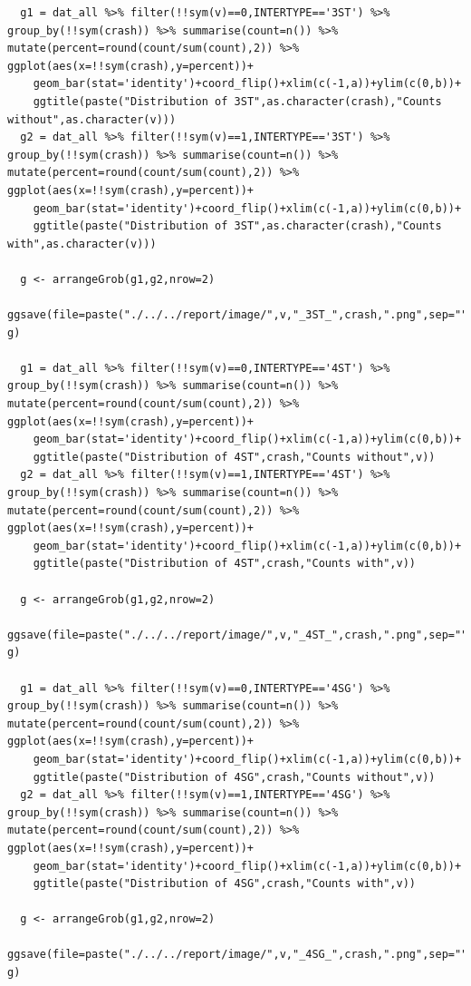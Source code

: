 \documentclass[11pt]{scrartcl} %
\begin{document}
\begin{lstlisting}
  g1 = dat_all %>% filter(!!sym(v)==0,INTERTYPE=='3ST') %>% group_by(!!sym(crash)) %>% summarise(count=n()) %>% mutate(percent=round(count/sum(count),2)) %>% ggplot(aes(x=!!sym(crash),y=percent))+
    geom_bar(stat='identity')+coord_flip()+xlim(c(-1,a))+ylim(c(0,b))+
    ggtitle(paste("Distribution of 3ST",as.character(crash),"Counts without",as.character(v)))
  g2 = dat_all %>% filter(!!sym(v)==1,INTERTYPE=='3ST') %>% group_by(!!sym(crash)) %>% summarise(count=n()) %>% mutate(percent=round(count/sum(count),2)) %>% ggplot(aes(x=!!sym(crash),y=percent))+
    geom_bar(stat='identity')+coord_flip()+xlim(c(-1,a))+ylim(c(0,b))+
    ggtitle(paste("Distribution of 3ST",as.character(crash),"Counts with",as.character(v)))

  g <- arrangeGrob(g1,g2,nrow=2)
  ggsave(file=paste("./../../report/image/",v,"_3ST_",crash,".png",sep=""), g)

  g1 = dat_all %>% filter(!!sym(v)==0,INTERTYPE=='4ST') %>% group_by(!!sym(crash)) %>% summarise(count=n()) %>% mutate(percent=round(count/sum(count),2)) %>% ggplot(aes(x=!!sym(crash),y=percent))+
    geom_bar(stat='identity')+coord_flip()+xlim(c(-1,a))+ylim(c(0,b))+
    ggtitle(paste("Distribution of 4ST",crash,"Counts without",v))
  g2 = dat_all %>% filter(!!sym(v)==1,INTERTYPE=='4ST') %>% group_by(!!sym(crash)) %>% summarise(count=n()) %>% mutate(percent=round(count/sum(count),2)) %>% ggplot(aes(x=!!sym(crash),y=percent))+
    geom_bar(stat='identity')+coord_flip()+xlim(c(-1,a))+ylim(c(0,b))+
    ggtitle(paste("Distribution of 4ST",crash,"Counts with",v))

  g <- arrangeGrob(g1,g2,nrow=2)
  ggsave(file=paste("./../../report/image/",v,"_4ST_",crash,".png",sep=""), g)

  g1 = dat_all %>% filter(!!sym(v)==0,INTERTYPE=='4SG') %>% group_by(!!sym(crash)) %>% summarise(count=n()) %>% mutate(percent=round(count/sum(count),2)) %>% ggplot(aes(x=!!sym(crash),y=percent))+
    geom_bar(stat='identity')+coord_flip()+xlim(c(-1,a))+ylim(c(0,b))+
    ggtitle(paste("Distribution of 4SG",crash,"Counts without",v))
  g2 = dat_all %>% filter(!!sym(v)==1,INTERTYPE=='4SG') %>% group_by(!!sym(crash)) %>% summarise(count=n()) %>% mutate(percent=round(count/sum(count),2)) %>% ggplot(aes(x=!!sym(crash),y=percent))+
    geom_bar(stat='identity')+coord_flip()+xlim(c(-1,a))+ylim(c(0,b))+
    ggtitle(paste("Distribution of 4SG",crash,"Counts with",v))

  g <- arrangeGrob(g1,g2,nrow=2)
  ggsave(file=paste("./../../report/image/",v,"_4SG_",crash,".png",sep=""), g)


\end{lstlisting}
\end{document}
